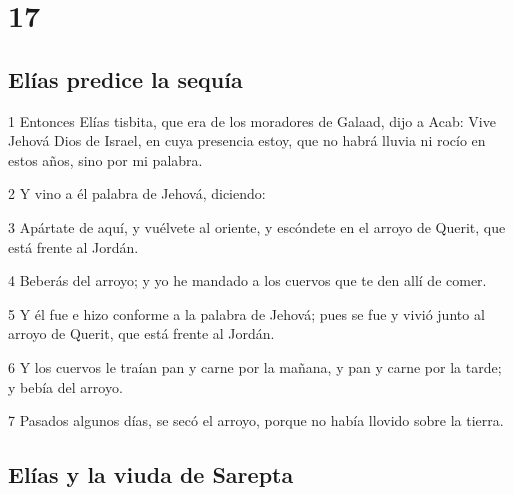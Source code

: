 \chapter{17}

\section*{Elías predice la sequía}

\par 1 Entonces Elías tisbita, que era de los moradores de Galaad, dijo a Acab: Vive Jehová Dios de Israel, en cuya presencia estoy, que no habrá lluvia ni rocío en estos años, sino por mi palabra. 
\par 2 Y vino a él palabra de Jehová, diciendo:
\par 3 Apártate de aquí, y vuélvete al oriente, y escóndete en el arroyo de Querit, que está frente al Jordán.
\par 4 Beberás del arroyo; y yo he mandado a los cuervos que te den allí de comer.
\par 5 Y él fue e hizo conforme a la palabra de Jehová; pues se fue y vivió junto al arroyo de Querit, que está frente al Jordán.
\par 6 Y los cuervos le traían pan y carne por la mañana, y pan y carne por la tarde; y bebía del arroyo. 
\par 7 Pasados algunos días, se secó el arroyo, porque no había llovido sobre la tierra.

\section*{Elías y la viuda de Sarepta}

